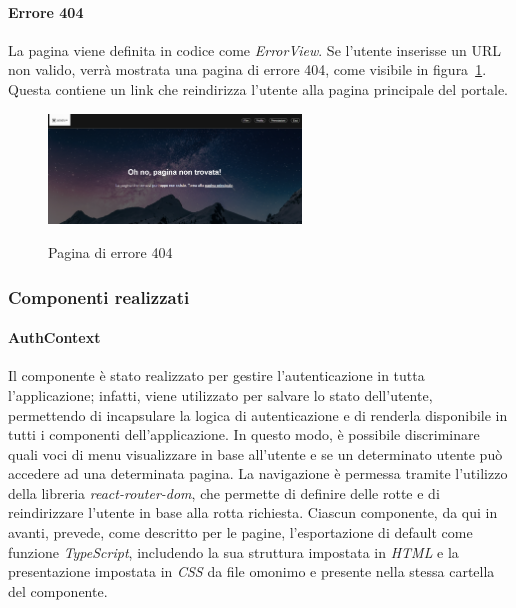 \paragraph{Errore 404}

La pagina viene definita in codice come \textit{ErrorView}.
Se l'utente inserisse un URL non valido, verrà mostrata una pagina di errore 404, come visibile in figura~\ref{fig:errore-404}.
Questa contiene un link che reindirizza l'utente alla pagina principale del portale.

\begin{figure}[ht]
    \centering
    \includegraphics[width=0.6\textwidth, alt={Schermata della pagina di errore 404}]{immagini/frontend/404.png}
    \caption{Pagina di errore 404}\label{fig:errore-404}
\end{figure}

\newpage

\subsubsection{Componenti realizzati}\label{sec:componenti-realizzati}

\paragraph{AuthContext}\label{par:authcontext}
Il componente è stato realizzato per gestire l'autenticazione in tutta l'applicazione; infatti, viene utilizzato per salvare lo stato dell'utente,
permettendo di incapsulare la logica di autenticazione e di renderla disponibile in tutti i componenti dell'applicazione.
In questo modo, è possibile discriminare quali voci di menu visualizzare in base all'utente e se un determinato utente può accedere ad una determinata pagina.
La navigazione è permessa tramite l'utilizzo della libreria \textit{react-router-dom}, che permette di definire delle rotte e di reindirizzare l'utente in base alla rotta richiesta.
Ciascun componente, da qui in avanti, prevede, come descritto per le pagine, l'esportazione di default come funzione \textit{TypeScript}, includendo la sua struttura impostata in \textit{HTML} e la presentazione impostata in \textit{CSS} da file omonimo
e presente nella stessa cartella del componente.


